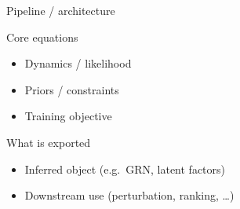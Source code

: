 
\begin{frame}{Pipeline / architecture}
\end{frame}

\begin{frame}{Core equations}
  \begin{itemize}
    \item Dynamics / likelihood
    \item Priors / constraints
    \item Training objective
  \end{itemize}
\end{frame}

\begin{frame}{What is exported}
  \begin{itemize}
    \item Inferred object (e.g.\ GRN, latent factors)
    \item Downstream use (perturbation, ranking, \ldots)
  \end{itemize}
\end{frame}
